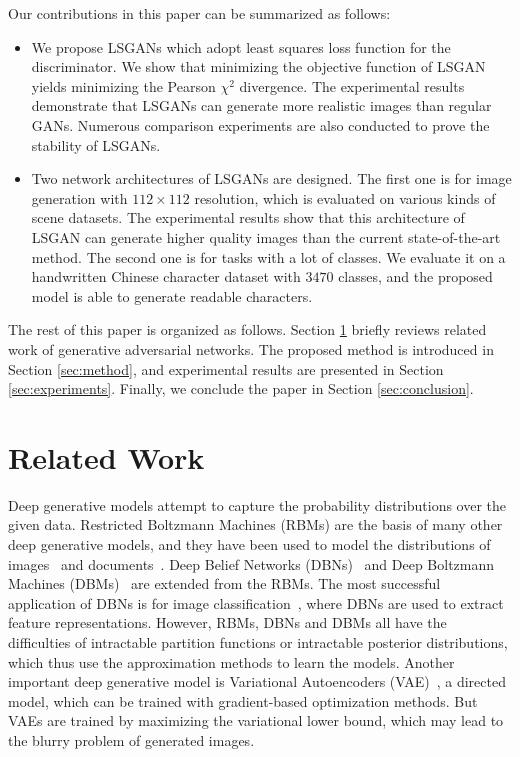 \documentclass{article} %
\begin{document}
Our contributions in this paper can be summarized as follows:
\begin{itemize}
\item We propose LSGANs which adopt least squares loss function for the discriminator. We show that minimizing the objective function of LSGAN yields minimizing the Pearson $\chi^2$ divergence. The experimental results demonstrate that LSGANs can generate more realistic images than regular GANs. Numerous comparison experiments are also conducted to prove the stability of LSGANs.
\item Two network architectures of LSGANs are designed. The first one is for image generation with $112 \times 112$ resolution, which is evaluated on various kinds of scene datasets. The experimental results show that this architecture of LSGAN can generate higher quality images than the current state-of-the-art method. The second one is for tasks with a lot of classes. We evaluate it on a handwritten Chinese character dataset with $3470$ classes, and the proposed model is able to generate readable characters.
\end{itemize}

The rest of this paper is organized as follows. Section \ref{sec:related} briefly reviews related work of generative adversarial networks. The proposed method is introduced in Section \ref{sec:method}, and experimental results are presented in Section \ref{sec:experiments}. Finally, we conclude the paper in Section \ref{sec:conclusion}.

\section{Related Work}
\label{sec:related}
Deep generative models attempt to capture the probability distributions over the given data. Restricted Boltzmann Machines (RBMs) are the basis of many other deep generative models, and they have been used to model the distributions of images~\cite{Taylor2010} and documents~\cite{Hinton2009}. Deep Belief Networks (DBNs)~\cite{Hinton2006_DBN} and Deep Boltzmann Machines (DBMs)~\cite{Salakhutdinov2009} are extended from the RBMs. The most successful application of DBNs is for image classification~\cite{Hinton2006_DBN}, where DBNs are used to extract feature representations. However, RBMs, DBNs and DBMs all have the difficulties of intractable partition functions or intractable posterior distributions, which thus use the approximation methods to learn the models. Another important deep generative model is Variational Autoencoders (VAE)~\cite{Kingma2013}, a directed model, which can be trained with gradient-based optimization methods. But VAEs are trained by maximizing the variational lower bound, which may lead to the blurry problem of generated images. 
\end{document}
